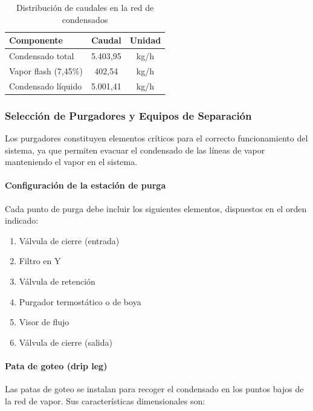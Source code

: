 \documentclass[12pt]{article}
\begin{document}
\begin{table}[H]
	\centering
	\caption{Distribución de caudales en la red de condensados}
	\label{tab:caudales-condensados}
	\begin{tabular}{lcc}
		\toprule
		\textbf{Componente}    & \textbf{Caudal} & \textbf{Unidad} \\
		\midrule
		Condensado total       & 5.403{,}95      & kg/h            \\
		Vapor flash (7{,}45\%) & 402{,}54        & kg/h            \\
		Condensado líquido     & 5.001{,}41      & kg/h            \\
		\bottomrule
	\end{tabular}
\end{table}

\subsubsection{Selección de Purgadores y Equipos de Separación}
\label{subsubsec:purgadores-separacion}

Los purgadores constituyen elementos críticos para el correcto funcionamiento del sistema, ya que permiten evacuar el condensado de las líneas de vapor manteniendo el vapor en el sistema.

\paragraph{Configuración de la estación de purga}

Cada punto de purga debe incluir los siguientes elementos, dispuestos en el orden indicado:

\begin{enumerate}[noitemsep]
	\item Válvula de cierre (entrada)
	\item Filtro en Y
	\item Válvula de retención
	\item Purgador termostático o de boya
	\item Visor de flujo
	\item Válvula de cierre (salida)
\end{enumerate}

\paragraph{Pata de goteo (drip leg)}

Las patas de goteo se instalan para recoger el condensado en los puntos bajos de la red de vapor. Sus características dimensionales son:
\end{document}
